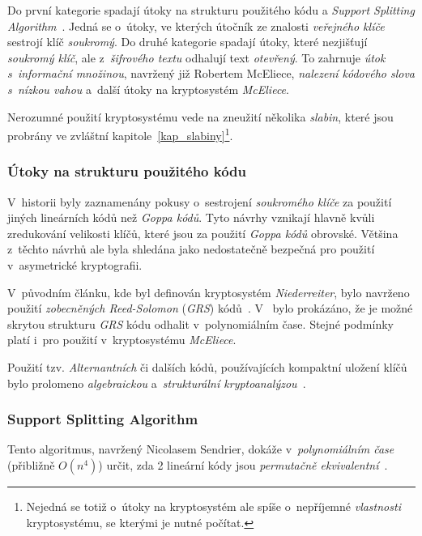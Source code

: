 \documentclass[thesis=M,czech,hidelinks]{FITthesis}[2012/06/26]
\newcommand{\0}{{\textcolor[gray]{0.75}{0}}}
\begin{document}
Do první kategorie spadají útoky na strukturu použitého kódu a \emph{Support
Splitting Algorithm}~\cite{Sendrier}. Jedná se o~útoky, ve kterých útočník ze
znalosti \emph{veřejného klíče} sestrojí klíč \emph{soukromý}. Do druhé
kategorie spadají útoky, které nezjišťují \emph{soukromý klíč}, ale
z~\emph{šifrového textu} odhalují text \emph{otevřený}. To zahrnuje \emph{útok
s~informační množinou}, navržený již Robertem McEliece, \emph{nalezení kódového
slova s~nízkou vahou} a~další útoky na kryptosystém \emph{McEliece}.

Nerozumné použití kryptosystému vede na zneužití několika \emph{slabin}, které
jsou probrány ve zvláštní kapitole~\ref{kap_slabiny}\footnote{
    Nejedná se totiž o~útoky na kryptosystém ale spíše o~nepříjemné
    \emph{vlastnosti} kryptosystému, se kterými je nutné počítat.
}.


\subsubsection{Útoky na strukturu použitého kódu}\label{kap_utoky_na_strukturu_kodu}

V~historii byly zaznamenány pokusy o~sestrojení \emph{soukromého klíče} za
použití jiných lineárních kódů než \emph{Goppa kódů}. Tyto návrhy vznikají
hlavně kvůli zredukování velikosti klíčů, které jsou za použití \emph{Goppa
kódů} obrovské. Většina z~těchto návrhů ale byla shledána jako nedostatečně
bezpečná pro použití v~asymetrické kryptografii.

V~původním článku, kde byl definován kryptosystém \emph{Niederreiter}, bylo
navrženo použití \emph{zobecněných Reed-Solomon} (\emph{GRS})
kódů~\cite{Niederreiter}. V~\cite{Sidelnikov} bylo prokázáno, že je možné
skrytou strukturu \emph{GRS} kódu odhalit v~polynomiálním čase. Stejné podmínky
platí i~pro použití v~kryptosystému \emph{McEliece}.

Použití tzv. \emph{Alternantních} či dalších kódů, používajících kompaktní
uložení klíčů bylo prolomeno \emph{algebraickou} a~\emph{strukturální
kryptoanalýzou}~\cite{Faugere1,Faugere2,Umana}.


\subsubsection{Support Splitting Algorithm}

Tento algoritmus, navržený Nicolasem Sendrier, dokáže v~\emph{polynomiálním
čase} (přibližně $O(n^4)$) určit, zda 2 lineární kódy jsou \emph{permutačně
ekvivalentní}~\cite{Sendrier}.
\end{document}
